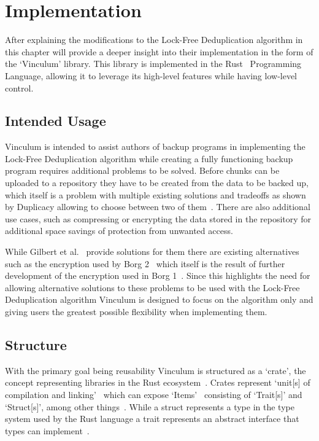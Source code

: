 \chapter{Implementation}\label{ch:implementation}

After explaining the modifications to the Lock-Free Deduplication algorithm
in  this chapter will provide a deeper insight into their
implementation in the form of the `Vinculum' library.
This library is implemented in the Rust~\cite{Rust} Programming Language, allowing
it to leverage its high-level features while having low-level control.

\section{Intended Usage}\label{sec:usage}

Vinculum is intended to assist authors of backup programs in implementing the
Lock-Free Deduplication algorithm while creating a fully functioning backup
program requires additional problems to be solved.
Before chunks can be uploaded to a repository they have to be created from the data
to be backed up, which itself is a problem with multiple existing solutions and tradeoffs
as shown by Duplicacy allowing to choose between two of them~\cite[section `Chunking']{Duplicacy}.
There are also additional use cases, such as compressing or encrypting the data
stored in the repository for additional space savings of protection from unwanted
access.

While Gilbert et al.~\cite{Duplicacy} provide solutions for them there are existing
alternatives such as the encryption used by Borg 2~\cite[section `Internals']{Borg2}
which itself is the result of further development of the encryption used in
Borg 1~\cite[section `Internals']{Borg1}.
Since this highlights the need for allowing alternative solutions to these
problems to be used with the Lock-Free Deduplication algorithm Vinculum is
designed to focus on the algorithm only and giving users the greatest possible
flexibility when implementing them.

\section{Structure}

With the primary goal being reusability Vinculum is structured as a `crate',
the concept representing libraries in the Rust ecosystem~\cite[section 20.4.]{Rust-Reference}.
Crates represent `unit[s] of compilation and linking'~\cite[section 20.4.]{Rust-Reference}
which can expose `Items'~\cite[section 20.4.]{Rust-Reference} consisting of
`Trait[s]' and `Struct[s]', among other things~\cite[section 6]{Rust-Reference}.
While a struct represents a type in the type system used by the Rust language
a trait represents an abstract interface that types can
implement~\cite[sections `6.6.' and `6.11.']{Rust-Reference}.

